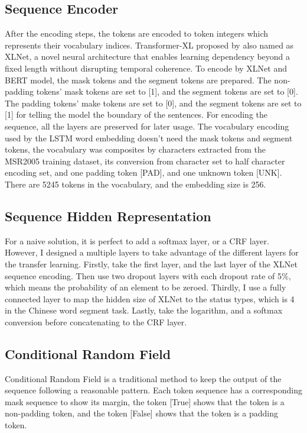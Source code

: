 \documentclass[11pt,a4paper]{article}
\begin{document}
\subsection{Sequence Encoder}

After the encoding steps, the tokens are encoded to token integers which represents their vocabulary indices.
Transformer-XL proposed by \citet{dai2019transformer} also named as XLNet, a novel neural architecture that enables learning dependency beyond a fixed length without disrupting temporal coherence.
To encode by XLNet and BERT model, the mask tokens and the segment tokens are prepared.
The non-padding tokens' mask tokens are set to [1], and the segment tokens are set to [0].
The padding tokens' make tokens are set to [0], and the segment tokens are set to [1] for telling the model the boundary of the sentences.
For encoding the sequence, all the layers are preserved for later usage.
The vocabulary encoding used by the LSTM word embedding doesn't need the mask tokens and segment tokens,
the vocabulary was composites by characters extracted from the MSR2005 training dataset, its conversion from character set to half character encoding set,
and one padding token [PAD], and one unknown token [UNK].
There are 5245 tokens in the vocabulary, and the embedding size is 256.

\subsection{Sequence Hidden Representation}

For a naive solution, it is perfect to add a softmax layer, or a CRF layer.
However, I designed a multiple layers to take advantage of the different layers for the transfer learning.
Firstly, take the first layer, and the last layer of the XLNet sequence encoding.
Then use two dropout layers with each dropout rate of 5\%, which means the probability of an element to be zeroed.
Thirdly, I use a fully connected layer to map the hidden size of XLNet to the status types, which is 4 in the Chinese word segment task.
Lastly, take the logarithm, and a softmax conversion before concatenating to the CRF layer.


\subsection{Conditional Random Field}

Conditional Random Field is a traditional method to keep the output of the sequence following a reasonable pattern.
Each token sequence has a corresponding mask sequence to show its margin, the token [True] shows that the token is a non-padding token,
and the token [False] shows that the token is a padding token.
\end{document}
